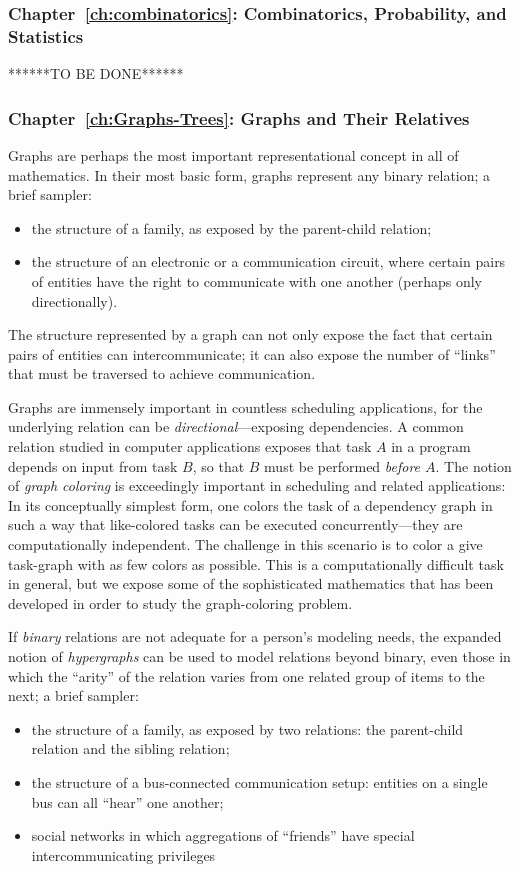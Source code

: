 \subsubsection{Chapter~\ref{ch:combinatorics}: Combinatorics,
  Probability, and Statistics}

******TO BE DONE******

\subsubsection{Chapter~\ref{ch:Graphs-Trees}: Graphs and Their Relatives}

Graphs are perhaps the most important representational concept in all
of mathematics.  In their most basic form, graphs represent any binary
relation; a brief sampler:
\begin{itemize}
\item
the structure of a family, as exposed by the parent-child relation;
\item
the structure of an electronic or a communication circuit, where
certain pairs of entities have the right to communicate with one
another (perhaps only directionally).
\end{itemize}
The structure represented by a graph can not only expose the fact that
certain pairs of entities can intercommunicate; it can also expose the
number of ``links'' that must be traversed to achieve communication.

Graphs are immensely important in countless scheduling applications,
for the underlying relation can be {\em directional}---exposing
dependencies.  A common relation studied in computer applications
exposes that task $A$ in a program depends on input from task $B$, so
that $B$ must be performed {\em before $A$}.  The notion of {\it graph
  coloring} is exceedingly important in scheduling and related
applications: In its conceptually simplest form, one colors the task
of a dependency graph in such a way that like-colored tasks can be
executed concurrently---they are computationally independent.  The
challenge in this scenario is to color a give task-graph with as few
colors as possible.  This is a computationally difficult task in
general, but we expose some of the sophisticated mathematics that has
been developed in order to study the graph-coloring problem.

\medskip

If {\em binary} relations are not adequate for a person's modeling
needs, the expanded notion of {\em hypergraphs} can be used to model
relations beyond binary, even those in which the ``arity'' of the
relation varies from one related group of items to the next; a brief
sampler:
\begin{itemize}
\item
the structure of a family, as exposed by two relations: the
parent-child relation and the sibling relation;
\item
the structure of a bus-connected communication setup: entities on a
single bus can all ``hear'' one another;
\item
social networks in which aggregations of ``friends'' have special
intercommunicating privileges
\end{itemize}


